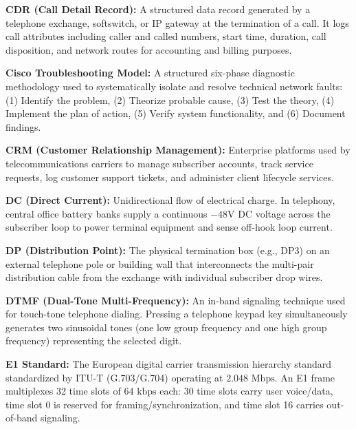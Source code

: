 \documentclass[12pt,a4paper]{report}
\begin{document}
\vspace{0.2cm}
\noindent\textbf{CDR (Call Detail Record):} A structured data record generated by a telephone exchange, softswitch, or IP gateway at the termination of a call. It logs call attributes including caller and called numbers, start time, duration, call disposition, and network routes for accounting and billing purposes.

\vspace{0.2cm}
\noindent\textbf{Cisco Troubleshooting Model:} A structured six-phase diagnostic methodology used to systematically isolate and resolve technical network faults: (1) Identify the problem, (2) Theorize probable cause, (3) Test the theory, (4) Implement the plan of action, (5) Verify system functionality, and (6) Document findings.

\vspace{0.2cm}
\noindent\textbf{CRM (Customer Relationship Management):} Enterprise platforms used by telecommunications carriers to manage subscriber accounts, track service requests, log customer support tickets, and administer client lifecycle services.

\vspace{0.2cm}
\noindent\textbf{DC (Direct Current):} Unidirectional flow of electrical charge. In telephony, central office battery banks supply a continuous $-48\text{V DC}$ voltage across the subscriber loop to power terminal equipment and sense off-hook loop current.

\vspace{0.2cm}
\noindent\textbf{DP (Distribution Point):} The physical termination box (e.g., DP3) on an external telephone pole or building wall that interconnects the multi-pair distribution cable from the exchange with individual subscriber drop wires.

\vspace{0.2cm}
\noindent\textbf{DTMF (Dual-Tone Multi-Frequency):} An in-band signaling technique used for touch-tone telephone dialing. Pressing a telephone keypad key simultaneously generates two sinusoidal tones (one low group frequency and one high group frequency) representing the selected digit.

\vspace{0.2cm}
\noindent\textbf{E1 Standard:} The European digital carrier transmission hierarchy standard standardized by ITU-T (G.703/G.704) operating at $2.048\text{ Mbps}$. An E1 frame multiplexes 32 time slots of $64\text{ kbps}$ each: 30 time slots carry user voice/data, time slot 0 is reserved for framing/synchronization, and time slot 16 carries out-of-band signaling.
\end{document}
